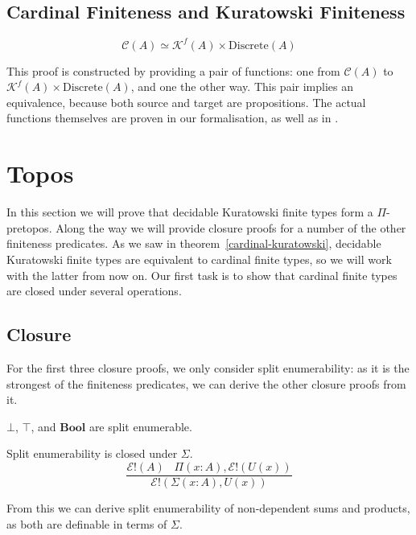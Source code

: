 \subsection{Cardinal Finiteness and Kuratowski Finiteness}
\begin{romlemma} \label{cardinal-kuratowski}
  \begin{equation}
    \mathcal{C}(A) \simeq \mathcal{K}^f(A) \times \text{Discrete}(A)
  \end{equation}
\end{romlemma}
This proof is constructed by providing a pair of functions: one from
\(\mathcal{C}(A)\) to \(\mathcal{K}^f(A) \times \text{Discrete}(A)\), and one the
other way.
This pair implies an equivalence, because both source and target are
propositions.
The actual functions themselves are proven in our formalisation, as well as in
\cite{fruminFiniteSetsHomotopy2018}.
\section{Topos} \label{topos}
In this section we will prove that decidable Kuratowski finite types form a
\(\Pi\)-pretopos.
Along the way we will provide closure proofs for a number of the other
finiteness predicates.
As we saw in theorem~\ref{cardinal-kuratowski}, decidable Kuratowski finite
types are equivalent to cardinal finite types, so we will work with the latter
from now on.
Our first task is to show that cardinal finite types are closed under several
operations.
\subsection{Closure}
For the first three closure proofs, we only consider split enumerability:
as it is the strongest of the finiteness predicates, we can derive the other
closure proofs from it.

\begin{romlemma}
  \(\bot\), \(\top\), and \(\mathbf{Bool}\) are split enumerable.
\end{romlemma}
\begin{romlemma} \label{split-enum-sigma}
  Split enumerability is closed under \(\Sigma\).
  \begin{equation}
    \frac{
      \mathcal{E}!(A) \; \; \; \Pi(x : A) , \mathcal{E}!(U(x))
    }{
      \mathcal{E}!(\Sigma(x : A) , U(x))
    }
  \end{equation}
\end{romlemma}
From this we can derive split enumerability of non-dependent sums and products,
as both are definable in terms of \(\Sigma\).

